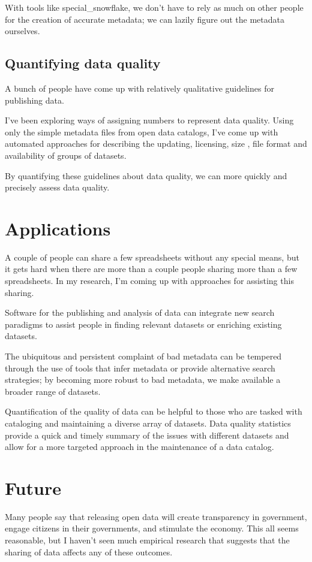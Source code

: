 \documentclass{acm_proc_article-sp}
\begin{document}
With tools like special\_snowflake, we don't have to rely as much on other
people for the creation of accurate metadata; we can lazily figure out the
metadata ourselves.

\subsection{Quantifying data quality}
A bunch of people \cite{open-data-census,fivestars,sunlight,sebastopol,odi}
have come up with relatively qualitative guidelines for publishing data.

I've been exploring ways of assigning numbers to represent data quality.
Using only the simple metadata files from open data catalogs, I've come up
with automated approaches for describing the updating, \cite{updatedness}
licensing, \cite{licensing} size \cite{summary}, file format \cite{file-formats}
and availability \cite{dead,zombie} of groups of datasets.

By quantifying these guidelines about data quality, we can more quickly and
precisely assess data quality.

\section{Applications}
A couple of people can share a few spreadsheets without any special means,
but it gets hard when there are more than a couple people sharing more than
a few spreadsheets. In my research, I'm coming up with approaches for assisting
this sharing.

Software for the publishing and analysis of data can integrate new search
paradigms to assist people in finding relevant datasets or enriching existing
datasets.

The ubiquitous and persistent complaint of bad metadata can be tempered through
the use of tools that infer metadata or provide alternative search strategies;
by becoming more robust to bad metadata, we make available a broader range of
datasets.

Quantification of the quality of data can be helpful to those who are tasked
with cataloging and maintaining a diverse array of datasets. Data quality
statistics provide a quick and timely summary of the issues with different
datasets and allow for a more targeted approach in the maintenance of a
data catalog.

\section{Future}
Many people say that releasing open data will create transparency in government,
engage citizens in their governments, and stimulate the economy. This all seems
reasonable, but I haven't seen much empirical research that suggests that the
sharing of data affects any of these outcomes.
\end{document}
